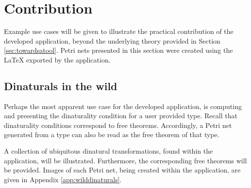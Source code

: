 \documentclass[../Dissertation.tex]{subfiles}
\begin{document}
\section{Contribution}
Example use cases will be given to illustrate the practical contribution of the developed application, beyond the underlying theory provided in Section \ref{sec:towardsatool}. Petri nets presented in this section were created using the LaTeX exported by the application.

\subsection{Dinaturals in the wild}
Perhaps the most apparent use case for the developed application, is computing and presenting the dinaturality condition for a user provided type. Recall that dinaturality conditions correspond to free theorems. Accordingly, a Petri net generated from a type can also be read as the free theorem of that type. 
\par
A collection of ubiquitous dinatural transformations, found within the application, will be illustrated. Furthermore, the corresponding free theorems will be provided. Images of each Petri net, being created within the application, are given in Appendix \ref{app:wilddinaturals}.
\end{document}
